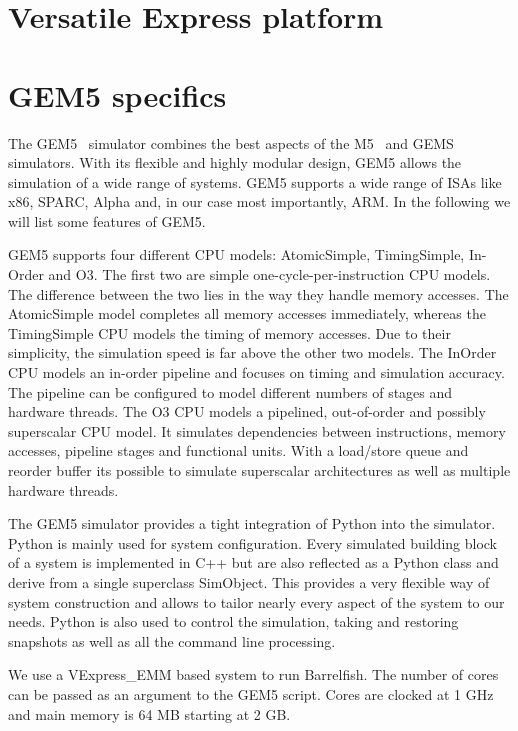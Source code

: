 \documentclass[a4paper,twoside]{report} %
\begin{document}
\chapter{Versatile Express platform}

\chapter{GEM5 specifics}

The GEM5~\cite{gem5:sigarch11} simulator combines the best aspects of
the M5~\cite{m5:micro06} and GEMS~\cite{gems:sigarch05}
simulators. With its flexible and highly modular design, GEM5 allows
the simulation of a wide range of systems. GEM5 supports a wide range
of ISAs like x86, SPARC, Alpha and, in our case most importantly,
ARM. In the following we will list some features of GEM5.

GEM5 supports four different CPU models: AtomicSimple, TimingSimple,
In-Order and O3. The first two are simple one-cycle-per-instruction
CPU models. The difference between the two lies in the way they handle
memory accesses. The AtomicSimple model completes all memory accesses
immediately, whereas the TimingSimple CPU models the timing of memory
accesses. Due to their simplicity, the simulation speed is far above
the other two models.  The InOrder CPU models an in-order pipeline and
focuses on timing and simulation accuracy. The pipeline can be
configured to model different numbers of stages and hardware threads.
The O3 CPU models a pipelined, out-of-order and possibly superscalar
CPU model. It simulates dependencies between instructions, memory
accesses, pipeline stages and functional units. With a load/store
queue and reorder buffer its possible to simulate superscalar
architectures as well as multiple hardware threads.

The GEM5 simulator provides a tight integration of Python into the
simulator. Python is mainly used for system configuration. Every
simulated building block of a system is implemented in C++ but are
also reflected as a Python class and derive from a single superclass
SimObject. This provides a very flexible way of system construction
and allows to tailor nearly every aspect of the system to our needs.
Python is also used to control the simulation, taking and restoring
snapshots as well as all the command line processing.

We use a VExpress\_EMM based system to run Barrelfish. The number of
cores can be passed as an argument to the GEM5 script. Cores are
clocked at 1 GHz and main memory is 64 MB starting at 2 GB.
\end{document}
